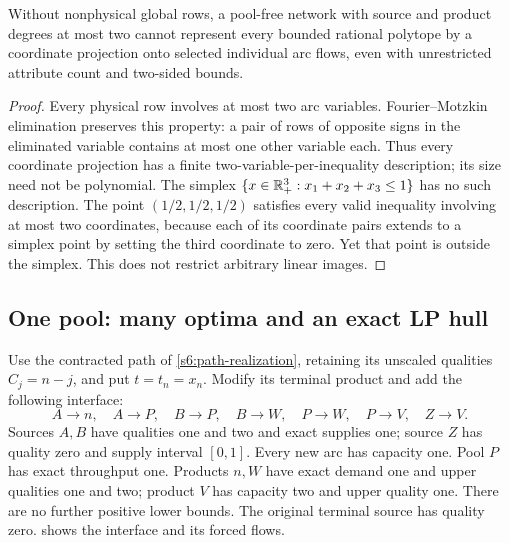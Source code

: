 \begin{proposition}\label{s6:ports}
Without nonphysical global rows, a pool-free network with source and
product degrees at most two cannot represent every bounded rational
polytope by a coordinate projection onto selected individual arc flows,
even with unrestricted attribute count and two-sided bounds.
\end{proposition}
\begin{proof}
Every physical row involves at most two arc variables. Fourier--Motzkin
elimination preserves this property: a pair of rows of opposite signs
in the eliminated variable contains at most one other variable each.
Thus every coordinate projection has a finite two-variable-per-inequality
description; its size need not be polynomial. The simplex
$\{x\in\mathbb R_+^3:x_1+x_2+x_3\le1\}$ has no such description.
The point $(1/2,1/2,1/2)$ satisfies every valid inequality involving at
most two coordinates, because each of its coordinate pairs extends to
a simplex point by setting the third coordinate to zero. Yet that point
is outside the simplex. This does not restrict arbitrary linear images.
\end{proof}

\subsection{One pool: many optima and an exact LP hull}\label{s6:geometry}
Use the contracted path of \cref{s6:path-realization}, retaining its
unscaled qualities $C_j=n-j$, and put $t=t_n=x_n$. Modify its terminal
product and add the following interface:
\[
 A\to n,\quad A\to P,\quad B\to P,\quad B\to W,\quad
 P\to W,\quad P\to V,\quad Z\to V.
\]
Sources $A,B$ have qualities one and two and exact supplies one;
source $Z$ has quality zero and supply interval $[0,1]$. Every new arc
has capacity one. Pool $P$ has exact throughput one. Products $n,W$
have exact demand one and upper qualities one and two; product $V$ has
capacity two and upper quality one. There are no further positive
lower bounds. The original terminal source has quality zero.
 shows the interface and its forced flows.


